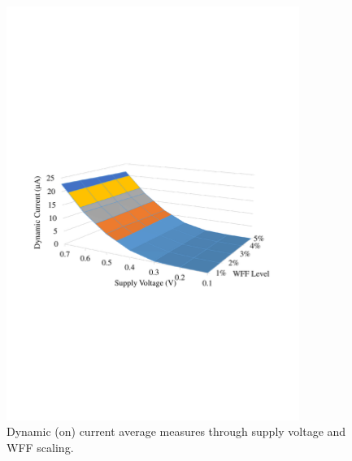 \documentclass[pgmicro,diss,english]{iiufrgs}
\begin{document}
    \begin{figure}[t]
        \centering
            \includegraphics[width=0.85\textwidth, trim={1.25cm 9cm 2cm 11cm}, clip]{dynamicCurrAbs.pdf}
            \caption{Dynamic (on) current average measures through supply voltage and WFF scaling.}
        \label{fig:dynCurrAbs}
    \end{figure}
\end{document}
